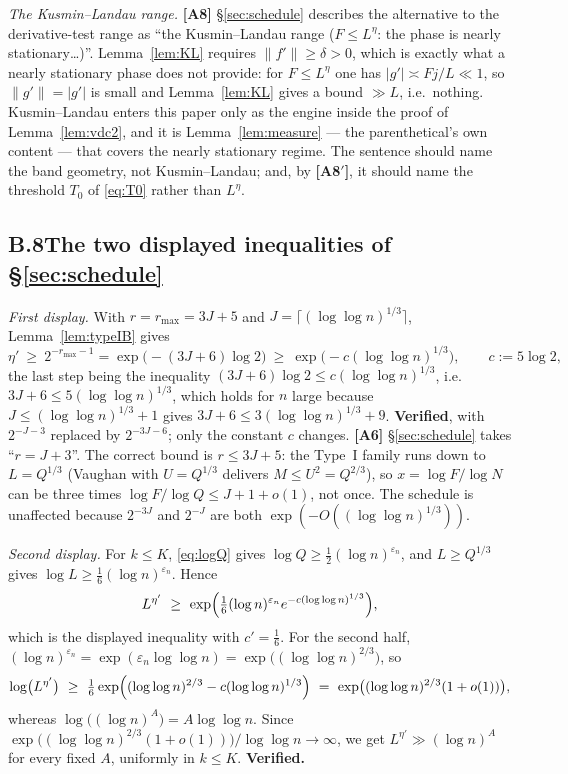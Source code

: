 \documentclass[11pt]{article}
\theoremstyle{definition}
\theoremstyle{plain}
\begin{document}
\noindent\emph{The Kusmin--Landau range.}  \textbf{[A8]}
\S\ref{sec:schedule} describes the alternative to the derivative-test
range as ``the Kusmin--Landau range ($F\le L^{\eta}$: the phase is nearly
stationary\ldots)''.  Lemma~\ref{lem:KL} requires $\|f'\|\ge\delta>0$,
which is exactly what a nearly stationary phase does not provide: for
$F\le L^{\eta}$ one has $|g'|\asymp Fj/L\ll1$, so
$\|g'\|=|g'|$ is small and Lemma~\ref{lem:KL} gives a bound
$\gg L$, i.e.\ nothing.  Kusmin--Landau enters this paper only as the
engine inside the proof of Lemma~\ref{lem:vdc2}, and it is
Lemma~\ref{lem:measure} --- the parenthetical's own content --- that
covers the nearly stationary regime.  The sentence should name the band
geometry, not Kusmin--Landau; and, by \textbf{[A8$'$]}, it should name
the threshold $T_{0}$ of \eqref{eq:T0} rather than $L^{\eta}$.

\subsection*{B.8\quad The two displayed inequalities of \S\ref{sec:schedule}}

\emph{First display.}  With $r=r_{\max}=3J+5$ and
$J=\lceil(\log\log n)^{1/3}\rceil$, Lemma~\ref{lem:typeIB} gives
\[
\eta'\ \ge\ 2^{-r_{\max}-1}=\exp\bigl(-(3J+6)\log2\bigr)
\ \ge\ \exp\bigl(-c(\log\log n)^{1/3}\bigr),\qquad c:=5\log 2,
\]
the last step being the inequality
$(3J+6)\log2\le c(\log\log n)^{1/3}$, i.e.\
$3J+6\le5(\log\log n)^{1/3}$, which holds for $n$ large because
$J\le(\log\log n)^{1/3}+1$ gives $3J+6\le3(\log\log n)^{1/3}+9$.
\textbf{Verified}, with $2^{-J-3}$ replaced by
$2^{-3J-6}$; only the constant $c$ changes.  \textbf{[A6]}
\S\ref{sec:schedule} takes ``$r=J+3$''.  The correct bound is
$r\le3J+5$: the Type~I family runs down to $L=Q^{1/3}$ (Vaughan with
$U=Q^{1/3}$ delivers $M\le U^{2}=Q^{2/3}$), so
$x=\log F/\log N$ can be three times
$\log F/\log Q\le J+1+o(1)$, not once.
The schedule is unaffected because $2^{-3J}$ and $2^{-J}$ are both
$\exp(-O((\log\log n)^{1/3}))$.

\emph{Second display.}  For $k\le K$, \eqref{eq:logQ} gives
$\log Q\ge\tfrac12(\log n)^{\varepsilon_{n}}$, and $L\ge Q^{1/3}$ gives
$\log L\ge\tfrac16(\log n)^{\varepsilon_{n}}$.  Hence
\[
L^{\eta'}\ \ge\ \exp\Bigl(\tfrac16(\log n)^{\varepsilon_{n}}
e^{-c(\log\log n)^{1/3}}\Bigr),
\]
which is the displayed inequality with $c'=\tfrac16$.  For the second
half, $(\log n)^{\varepsilon_{n}}
=\exp(\varepsilon_{n}\log\log n)=\exp\bigl((\log\log n)^{2/3}\bigr)$,
so
\[
\log\bigl(L^{\eta'}\bigr)\ \ge\
\tfrac16\exp\Bigl((\log\log n)^{2/3}-c(\log\log n)^{1/3}\Bigr)
\ =\ \exp\bigl((\log\log n)^{2/3}(1+o(1))\bigr),
\]
whereas $\log\bigl((\log n)^{A}\bigr)=A\log\log n$.  Since
$\exp\bigl((\log\log n)^{2/3}(1+o(1))\bigr)/\log\log n\to\infty$, we get
$L^{\eta'}\gg(\log n)^{A}$ for every fixed $A$, uniformly in $k\le K$.
\textbf{Verified.}
\end{document}
